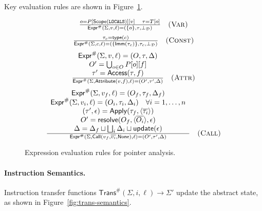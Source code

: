 Key evaluation rules are shown in Figure~\ref{fig:expr-semantics}.

\begin{figure}[t]
\centering
\[
\begin{array}{c}
\frac{
  o = P[\mathsf{Scope}(\mathtt{LOCALS})][v]
  \quad \tau = T[o]
}{
  \mathsf{Expr}^\#(\Sigma, v, \ell) = (\{o\}, \tau, \bot_\mathcal{D})
} \quad \textsc{(Var)}
\\[2ex]
\frac{
  \tau_c = \mathsf{type}(c)
}{
  \mathsf{Expr}^\#(\Sigma, c, \ell) = (\{\mathsf{Imm}(\tau_c)\}, \tau_c, \bot_\mathcal{D})
} \quad \textsc{(Const)}
\\[2ex]
\frac{
  \begin{array}{c}
    \mathsf{Expr}^\#(\Sigma, v, \ell) = (O,\tau,\Delta) \\
    O' = \bigcup_{o\in O} P[o][f] \\
    \tau' = \mathsf{Access}(\tau,f)
  \end{array}
}{
  \mathsf{Expr}^\#(\Sigma, \mathsf{Attribute}(v,f), \ell)
    = (O',\tau',\Delta)
} \quad \textsc{(Attr)}
\\[2ex]
\frac{
  \begin{array}{c}
    \mathsf{Expr}^\#(\Sigma,v_f,\ell) = (O_f,\tau_f,\Delta_f) \\
    \mathsf{Expr}^\#(\Sigma,v_i,\ell) = (O_i,\tau_i,\Delta_i)\quad\forall i=1,\dots,n \\
    (\tau',\epsilon) = \mathsf{Apply}(\tau_f,\langle\overline{\tau_i}\rangle) \\
    O' = \mathsf{resolve}(O_f,\langle\overline{O_i}\rangle,\epsilon) \\
    \Delta = \Delta_f \sqcup \bigsqcup_i \Delta_i \sqcup \mathsf{update}(\epsilon)
  \end{array}
}{
  \mathsf{Expr}^\#(\Sigma,\mathsf{Call}(v_f,\overline{v_i},\mathsf{None}),\ell)
    = (O',\tau',\Delta)
} \quad \textsc{(Call)}
\end{array}
\]
\caption{Expression evaluation rules for pointer analysis.}
\label{fig:expr-semantics}
\end{figure}

\paragraph{Instruction Semantics.}
Instruction transfer functions \(\mathsf{Trans}^\#(\Sigma,i,\ell) \to \Sigma'\) update the abstract state, as shown in Figure~\ref{fig:trans-semantics}.

